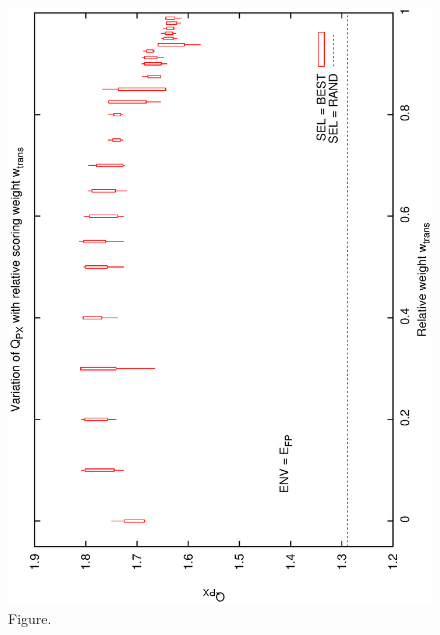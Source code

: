 \documentclass[12pt,a4paper]{article}
\begin{document}
\begin{figure}[htbp]
 \begin{center}
  \includegraphics[scale=1.0, angle=0]{figures/cs1_dw1_px.eps}
 \end{center}
  \caption[Figure.]
{Figure.}
\end{figure}
\clearpage
\end{document}
